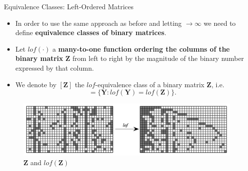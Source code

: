\documentclass[aspectratio=169,xcolor=dvipsnames]{beamer}
\newcommand{\matz}{\textbf{Z}}
\begin{document}
\begin{frame}{Equivalence Classes: Left-Ordered Matrices}
\setlength{\leftmargini}{0.2cm}
\begin{itemize}[<+->]
\item In order to use the same approach as before and letting $\rightarrow\infty$ we need to define \textbf{equivalence classes of binary matrices}.
\item Let $lof( \cdot)$ a \textbf{many-to-one function ordering the columns of the binary matrix} $\matz$ from left to right by the magnitude of the binary number expressed by that column.
\item We denote by  $[\matz]$ the $lof$-equivalence class of a binary matrix $\matz$, i.e. 
\begin{equation*}
    [\matz] = \{ \boldsymbol{Y}: lof(\boldsymbol{Y})=lof(\matz)\}.
\end{equation*}
\end{itemize}
\pause
\begin{figure}
    \centering
    \includegraphics[width=0.7\columnwidth]{utilities/lof.png}
    \caption{$\matz$ and $lof(\matz)$}
    \label{fig:my_label}
\end{figure}
\end{frame}
\end{document}
